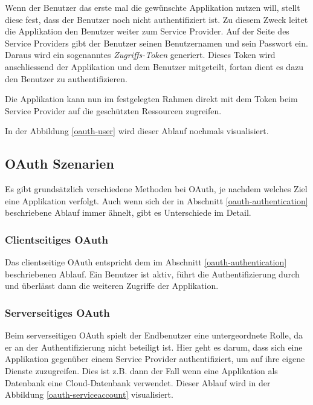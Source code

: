 Wenn der Benutzer das erste mal die gewünschte Applikation nutzen will, stellt diese fest, dass der Benutzer noch nicht authentifiziert ist. Zu diesem Zweck leitet die Applikation den Benutzer weiter zum Service Provider. Auf der Seite des Service Providers gibt der Benutzer seinen Benutzernamen und sein Passwort ein. Daraus wird ein sogenanntes \emph{Zugriffs-Token} generiert. Dieses Token wird anschliessend der Applikation und dem Benutzer mitgeteilt, fortan dient es dazu den Benutzer zu authentifizieren.

Die Applikation kann nun im festgelegten Rahmen direkt mit dem Token beim Service Provider auf die geschützten Ressourcen zugreifen.

In der Abbildung \ref{oauth-user} wird dieser Ablauf nochmals visualisiert.

\subsection{OAuth Szenarien}
Es gibt grundsätzlich verschiedene Methoden bei \gls{OAuth}, je nachdem welches Ziel eine Applikation verfolgt. Auch wenn sich der in Abschnitt \ref{oauth-authentication} beschriebene Ablauf immer ähnelt, gibt es Unterschiede im Detail.

\subsubsection{Clientseitiges OAuth}
Das clientseitige \gls{OAuth} entspricht dem im Abschnitt \ref{oauth-authentication} beschriebenen Ablauf. Ein Benutzer ist aktiv, führt die Authentifizierung durch und überlässt dann die weiteren Zugriffe der Applikation.

\subsubsection{Serverseitiges OAuth}
\label{oauth-authentication-server}
Beim serverseitigen \gls{OAuth} spielt der Endbenutzer eine untergeordnete Rolle, da er an der Authentifizierung nicht beteiligt ist. Hier geht es darum, dass sich eine Applikation gegenüber einem Service Provider authentifiziert, um auf ihre eigene Dienste zuzugreifen. Dies ist z.B. dann der Fall wenn eine Applikation als Datenbank eine \gls{Cloud}-Datenbank verwendet. Dieser Ablauf wird in der Abbildung \ref{oauth-serviceaccount} visualisiert.

